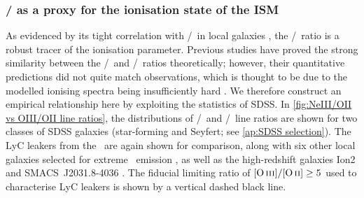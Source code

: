 \subsubsection{\texorpdfstring{\NeIII/\OII}{[NeIII]/[OII]} as a proxy for the ionisation state of the ISM}
\label{sssec:NeIII/OII as a proxy for the ionisation state of the ISM}

As evidenced by its tight correlation with \OIIIf/\OII\ in local galaxies \citep[e.g.][]{2020ApJ...902L..16J}, the \NeIII/\OII\ ratio is a robust tracer of the ionisation parameter. Previous studies have proved the strong similarity between the \NeIII/\OII\ and \OIIIf/\OII\ ratios theoretically; however, their quantitative predictions did not quite match observations, which is thought to be due to the modelled ionising spectra being insufficiently hard \citep{2014ApJ...780..100L}. We therefore construct an empirical relationship here by exploiting the statistics of SDSS. In \cref{fig:NeIII/OII vs OIII/OII line ratios}, the distributions of \NeIII/\OII\ and \OIIIf/\OII\ line ratios are shown for two classes of SDSS galaxies (star-forming and Seyfert; see \cref{ap:SDSS selection}). The LyC leakers from the \Isample\ are again shown for comparison, along with six other local galaxies selected for extreme \OIIIf\ emission \citep[``Green Peas'', or GPs;][]{2013ApJ...766...91J}, as well as the high-redshift galaxies Ion2 and SMACS~J2031.8-4036 \citep[, respectively]{2020MNRAS.491.1093V, 2012MNRAS.427.1953C}. The fiducial limiting ratio of $\OIIIf/\OII \geq 5$ used to characterise LyC leakers is shown by a vertical dashed black line.

